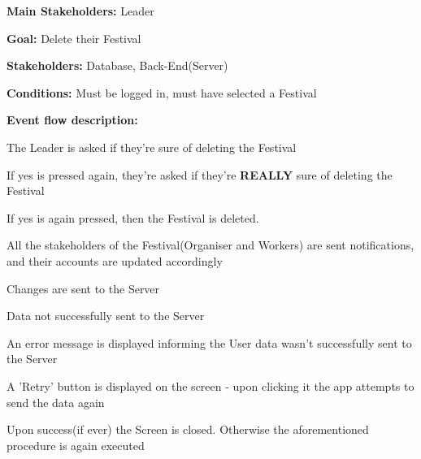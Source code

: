 				\noindent {}
				\begin{packed_item}
					\item \textbf{Main Stakeholders:} Leader
					\item \textbf{Goal:} Delete their Festival
					\item \textbf{Stakeholders: } Database, Back-End(Server)
					\item \textbf{Conditions: } Must be logged in, must have selected a Festival
					\item \textbf{Event flow description: }
					\begin{packed_enum}
						\item The Leader is asked if they're sure of deleting the Festival
						\item If yes is pressed again, they're asked if they're \textbf{REALLY} sure of deleting the Festival
						\item If yes is again pressed, then the Festival is deleted.
						\item All the stakeholders of the Festival(Organiser and Workers) are sent notifications, and their accounts are updated accordingly
						\item Changes are sent to the Server
					\end{packed_enum}
					
					\begin{packed_item}
						\item[5.a] Data not successfully sent to the Server
						\item[] \begin{packed_enum}
							\item An error message is displayed informing the User data wasn't successfully sent to the Server
							\item A 'Retry' button is displayed on the screen - upon clicking it the app attempts to send the data again
							\item Upon success(if ever) the Screen is closed. Otherwise the aforementioned procedure is again executed
						\end{packed_enum}
					\end{packed_item}
			\end{packed_item}
			
